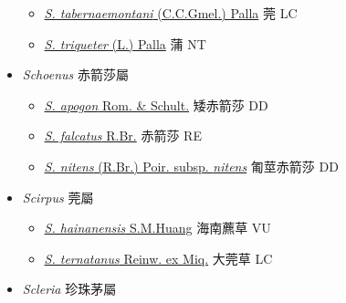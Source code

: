 \begin{itemize}
  \begin{itemize}
        \item[] \href{http://www.theplantlist.org/tpl1.1/search?q=Schoenoplectus+tabernaemontani}{\textit{S. tabernaemontani} (C.C.Gmel.) Palla}     莞 LC
        \item[] \href{http://www.theplantlist.org/tpl1.1/search?q=Schoenoplectus+triqueter}{\textit{S. triqueter} (L.) Palla}   蒲 NT
  \end{itemize}
 \item[] \textit{Schoenus} 赤箭莎屬
                    
  \begin{itemize}
        \item[] \href{http://www.theplantlist.org/tpl1.1/search?q=Schoenus+apogon}{\textit{S. apogon} Rom. \& Schult.}   矮赤箭莎 DD
        \item[] \href{http://www.theplantlist.org/tpl1.1/search?q=Schoenus+falcatus}{\textit{S. falcatus} R.Br.}   赤箭莎 RE
        \item[] \href{http://www.theplantlist.org/tpl1.1/search?q=Schoenus+nitens+subsp.+nitens}{\textit{S. nitens} (R.Br.) Poir. subsp. \textit{nitens}}   匍莖赤箭莎 DD
  \end{itemize}
 \item[] \textit{Scirpus} 莞屬
                    
  \begin{itemize}
        \item[] \href{http://www.theplantlist.org/tpl1.1/search?q=Scirpus+hainanensis}{\textit{S. hainanensis} S.M.Huang}   海南藨草 VU
        \item[] \href{http://www.theplantlist.org/tpl1.1/search?q=Scirpus+ternatanus}{\textit{S. ternatanus} Reinw. ex Miq.}   大莞草 LC
  \end{itemize}
 \item[] \textit{Scleria} 珍珠茅屬
                    

\end{itemize}
